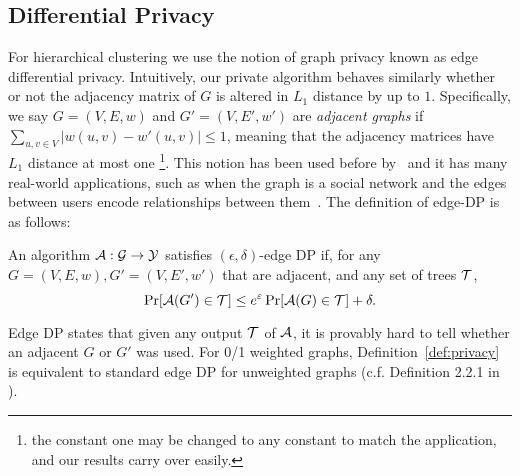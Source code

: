\subsection{Differential Privacy}
For hierarchical clustering we use the notion of graph privacy known as edge differential privacy. Intuitively, our private algorithm behaves similarly whether or not the adjacency matrix of $G$ is altered in $L_1$ distance by up to $1$. Specifically, we say $G = (V, E, w)$ and $G' = (V, E', w')$ are \emph{adjacent graphs} if $\sum_{u,v \in V} |w(u,v) - w'(u,v)| \leq 1$, meaning that the adjacency matrices have $L_1$ distance at most one \footnote{the constant one may be changed to any constant to match the application, and our results carry over easily.}. This notion has been used before by~\citet{ eliavs2020differentially, blocki2012johnson} and it has many real-world applications, such as when the graph is a social network and the edges between users encode relationships between them~\citep{epasto2022differentially}.
The definition of edge-DP is as follows:
\begin{defn}\label{def:privacy}
An algorithm $\mathcal{A} : \mathcal{G} \rightarrow \mathcal{Y}$ satisfies $(\epsilon, \delta)$-edge DP if, for any $G = (V,E,w), G' = (V,E',w')$ that are adjacent, and any set of trees $\mathcal{T}$,
\[
    \Pr[\mathcal{A}(G') \in \mathcal{T} ] \leq e^\varepsilon \Pr[\mathcal{A}(G) \in \mathcal{T}] + \delta.
\]
\end{defn}
Edge DP states that given any output $\mathcal{T}$ of $\mathcal{A}$, it is provably hard to tell whether an adjacent $G$ or $G'$ was used.
For 0/1 weighted graphs, Definition~\ref{def:privacy} is equivalent to standard edge DP for unweighted graphs (c.f. Definition 2.2.1 in \cite{pinot2018minimum}).
